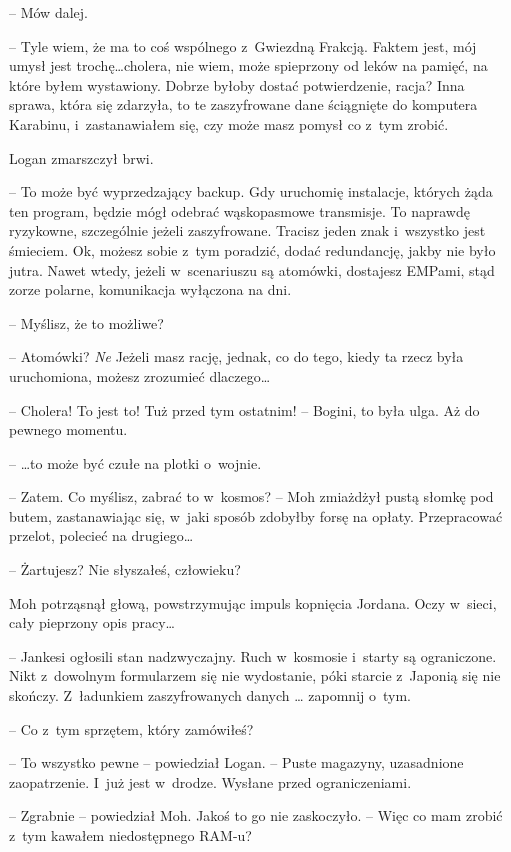 \documentclass[oneside,polish,11pt,sfheadings]{mwbk}
\begin{document}
-- Mów dalej.

-- Tyle wiem, że ma to coś wspólnego z~Gwiezdną Frakcją. Faktem jest, mój
umysł jest trochę\ldots cholera, nie wiem, może spieprzony od leków na
pamięć, na które byłem wystawiony. Dobrze byłoby dostać potwierdzenie,
racja? Inna sprawa, która się zdarzyła, to te zaszyfrowane dane
ściągnięte do komputera Karabinu, i~zastanawiałem się, czy może masz
pomysł co z~tym zrobić.

Logan zmarszczył brwi. 

-- To może być wyprzedzający backup. Gdy uruchomię
instalacje, których żąda ten program, będzie mógł odebrać wąskopasmowe
transmisje. To naprawdę ryzykowne, szczególnie jeżeli zaszyfrowane.
Tracisz jeden znak i~wszystko jest śmieciem. Ok, możesz sobie z~tym
poradzić, dodać redundancję, jakby nie było jutra. Nawet wtedy, jeżeli w~scenariuszu są atomówki, dostajesz EMPami, stąd zorze polarne,
komunikacja wyłączona na dni.

-- Myślisz, że to możliwe?

-- Atomówki? \emph{Ne} Jeżeli masz rację, jednak, co do tego, kiedy ta
rzecz była uruchomiona, możesz zrozumieć dlaczego\ldots

-- Cholera! To jest to! Tuż przed tym ostatnim! -- Bogini, to była ulga.
Aż do pewnego momentu.

-- \ldots to może być czułe na plotki o~wojnie.

-- Zatem. Co myślisz, zabrać to w~kosmos? -- Moh zmiażdżył pustą słomkę
pod butem, zastanawiając się, w~jaki sposób zdobyłby forsę na opłaty.
Przepracować przelot, polecieć na drugiego\ldots

-- Żartujesz? Nie słyszałeś, człowieku?

Moh potrząsnął głową, powstrzymując impuls kopnięcia Jordana. Oczy w~sieci, cały pieprzony opis pracy\ldots

-- Jankesi ogłosili stan nadzwyczajny. Ruch w~kosmosie i~starty są
ograniczone. Nikt z~dowolnym formularzem się nie wydostanie, póki
starcie z~Japonią się nie skończy. Z~ładunkiem zaszyfrowanych danych \ldots
zapomnij o~tym.

-- Co z~tym sprzętem, który zamówiłeś?

-- To wszystko pewne -- powiedział Logan. -- Puste magazyny, uzasadnione
zaopatrzenie. I~już jest w~drodze. Wysłane przed ograniczeniami.

-- Zgrabnie -- powiedział Moh. Jakoś to go nie zaskoczyło. -- Więc co mam
zrobić z~tym kawałem niedostępnego RAM-u?
\end{document}

